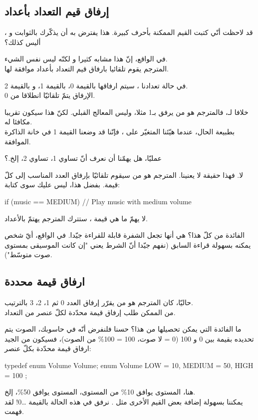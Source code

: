 \subsection{إرفاق قيم التعداد بأعداد}
قد لاحظت أنّي كتبت القيم الممكنة بأحرف كبيرة. هذا يفترض به أن يذكّرك بالثوابت و
،
أليس كذلك؟

في الواقع، إنّ هذا مشابه كثيرا و لكنّه ليس نفس الشيء.\\
المترجم يقوم تلقائيا بارفاق قيم التعداد بأعداد موافقة لها.


في حالة تعدادنا
،
سيتم ارفاقها بالقيمة 0،
بالقيمة 1،
و
بالقيمة 2.\\
الإرفاق يتمّ تلقائيّا انطلاقا من 0.

خلافا لـ،
فالمترجم هو من يرفق
بـ1 مثلا، وليس المعالج القبلي. لكنّ هذا سيكون تقريبا مكافئا له.\\
بطبيعة الحال، عندما هيّئنا المتغيّر
على
،
فإنّنا قد وضعنا القيمة 1 في خانة الذاكرة الموافقة.

\begin{question}
عمليّا، هل يهمّنا أن نعرف أنّ
تساوي 1،
تساوي 2، إلخ.؟
\end{question}

لا. فهذا حقيقة لا يعنينا. المترجم هو من سيقوم تلقائيّا بإرفاق العدد المناسب إلى كلّ قيمة. بفضل هذا، ليس عليك سوى كتابة:
\begin{Csource}
if (music == MEDIUM)
{
	// Play music with medium volume
}
\end{Csource}
لا يهمّ ما هي قيمة
،
ستترك المترجم يهتمّ بالأعداد.

الفائدة من كلّ  هذا؟  هي أنها تجعل الشفرة قابلة للقراءة جيّدا. في الواقع، أيّ شخص يمكنه بسهولة قراءة
السابق (نفهم جيّدا أنّ الشرط يعني "إن كانت الموسيقى بمستوى صوت متوسّط").

\subsection{ارفاق قيمة محددة}
حاليّا، كان المترجم هو من يقرّر إرفاق العدد 0 ثم 1، 2، 3
 بالترتيب.\\
من الممكن طلب إرفاق قيمة محدّدة لكلّ عنصر من التعداد.

ما الفائدة التي يمكن تحصيلها من هذا؟ حسنا فلنفرض أنّه في حاسوبك، الصوت يتم تحديده بقيمة بين 0 و 100 (0 = لا صوت، 100 = 100\%
من الصوت)، فسيكون من الجيد ارفاق قيمة محدّدة بكلّ عنصر:
\begin{Csource}
typedef enum Volume Volume;
enum Volume
{
	LOW = 10, MEDIUM = 50, HIGH = 100
};
\end{Csource}
هنا، المستوى
يوافق 10\%
من المستوى، المستوى
يوافق 50\%،
إلخ.\\
يمكننا بسهولة إضافة بعض القيم الأخرى مثل
.
نرفق في هذه الحالة
بالقيمة \dots 0! لقد فهمت.

